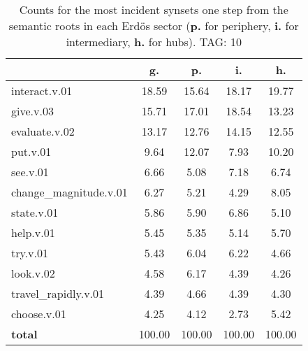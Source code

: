 \begin{table}[h!]
\begin{center}
\begin{tabular}{| l | c | c | c | c |}\hline
 & g. & p. & i. & h. \\\hline
interact.v.01 & 18.59  & 15.64  & 18.17  & 19.77 \\\hline
give.v.03 & 15.71  & 17.01  & 18.54  & 13.23 \\\hline
evaluate.v.02 & 13.17  & 12.76  & 14.15  & 12.55 \\\hline
put.v.01 & 9.64  & 12.07  & 7.93  & 10.20 \\\hline
see.v.01 & 6.66  & 5.08  & 7.18  & 6.74 \\\hline
change\_magnitude.v.01 & 6.27  & 5.21  & 4.29  & 8.05 \\\hline
state.v.01 & 5.86  & 5.90  & 6.86  & 5.10 \\\hline
help.v.01 & 5.45  & 5.35  & 5.14  & 5.70 \\\hline
try.v.01 & 5.43  & 6.04  & 6.22  & 4.66 \\\hline
look.v.02 & 4.58  & 6.17  & 4.39  & 4.26 \\\hline
travel\_rapidly.v.01 & 4.39  & 4.66  & 4.39  & 4.30 \\\hline
choose.v.01 & 4.25  & 4.12  & 2.73  & 5.42 \\\hline
{{\bf total}} & 100.00  & 100.00  & 100.00  & 100.00 \\\hline
\end{tabular}
\caption{Counts for the most incident synsets one step from the semantic roots in each Erd\"os sector ({\bf p.} for periphery, {\bf i.} for intermediary, {\bf h.} for hubs). TAG: 10}
\end{center}
\end{table}